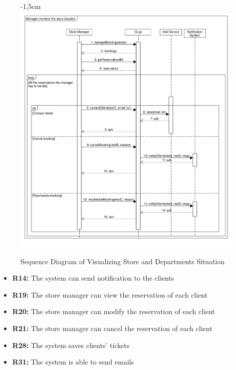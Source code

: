 \documentclass{article}
\begin{document}
\begin{center}
\begin{adjustwidth}{-2.8cm}{}
\begin{tabular}[h!]{|m{7.5em}|m{36em}|}
						\end{tabular}
					\end{adjustwidth}
				\newpage
					\begin{figure}[!h]
						\begin{adjustwidth} {-1,5cm}{}
							\centering
							\includegraphics[scale=0.42]{SD/9_manageReservations(store)}\\
							\caption{Sequence Diagram of Visualizing Store and Departments Situation}
						\end{adjustwidth}
					\end{figure}
					\begin{itemize}
						\medskip
						
						{\bfseries Required functional requirements: }
						
						\item {\bfseries R14: } The system can send notiﬁcation to the clients
						\item {\bfseries R19: }  The store manager can view the reservation of each client
						\item {\bfseries R20: } The store manager can modify the reservation of each client
						\item {\bfseries R21: } The store manager can cancel the reservation of each client
						\item {\bfseries R28: } The system saves clients' tickets
						\item {\bfseries R31: } The system is able to send emails
						

					\end{itemize}	
					
				\end{center}
			
\end{document}
